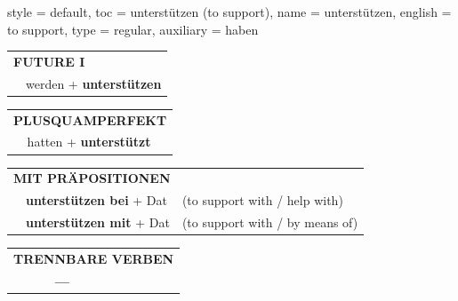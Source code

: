 \begin{verbentry}{
  style = {default},
  toc = {unterstützen (to support)},
  name = {unterstützen},
  english = {to support},
  type = {regular},
  auxiliary = {haben}
}
\begin{tabular}{rl}
    \multicolumn{2}{l}{\textbf{FUTURE I} }\\
   & werden + \textbf{unterstützen}\\
 
  \end{tabular}
\hfill
   \begin{tabular}{rl}
      \multicolumn{2}{l}{\textbf{PLUSQUAMPERFEKT}}\\
   & hatten + \textbf{unterstützt}\\
  \end{tabular}

   \vspace{10pt}

   \begin{tabular}{lll}
      \multicolumn{3}{l}{\textbf{MIT PRÄPOSITIONEN}}\\
& \textbf{unterstützen bei} + Dat & (to support with / help with)\\
& \textbf{unterstützen mit} + Dat & (to support with / by means of)\\
\end{tabular}
  \hfill
   \begin{tabular}{lll}
\multicolumn{3}{l}{\textbf{TRENNBARE VERBEN}}\\
& \textbf{---} & \\
\end{tabular}


  \vspace{-5pt}
\end{verbentry}

